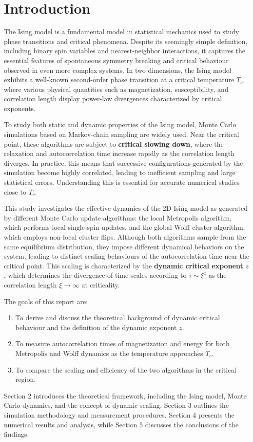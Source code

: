 \section{Introduction}


The Ising model is a fundamental model in statistical mechanics used to study phase transitions and critical phenomena.
Despite its seemingly simple definition, including binary spin variables and nearest-neighbor interactions, it captures the essential features of spontaneous symmetry breaking and critical behaviour observed in even more complex systems.
In two dimensions, the Ising model exhibits a well-known second-order phase transition at a critical temperature $T_c$, where various physical quantities such as magnetization, susceptibility, and correlation length display power-law divergences characterized by critical exponents.

To study both static and dynamic properties of the Ising model, Monte Carlo simulations based on Markov-chain sampling are widely used.
Near the critical point, these algorithms are subject to \textbf{critical slowing down}, where the relaxation and autocorrelation time increase rapidly as the correlation length diverges.
In practice, this means that successive configurations generated by the simulation become highly correlated, leading to inefficient sampling and large statistical errors.
Understanding this is essential for accurate numerical studies close to $T_c$.

This study investigates the effective dynamics of the 2D Ising model as generated by different Monte Carlo update algorithms: the local Metropolis algorithm, which performs local single-spin updates, and the global Wolff cluster algorithm, which employs non-local cluster flips.
Although both algorithms sample from the same equilibrium distribution, they impose different dynamical behaviors on the system, leading to distinct scaling behaviours of the autocorrelation time near the critical point.
This scaling is characterized by the \textbf{dynamic critical exponent} $z$, which determines the divergence of time scales according to $\tau \sim \xi^{z}$ as the correlation length $\xi \to \infty$ at criticality.

The goals of this report are:

\begin{enumerate}
    \item To derive and discuss the theoretical background of dynamic critical behaviour and the definition of the dynamic exponent \(z\).
    \item To measure autocorrelation times of magnetization and energy for both Metropolis and Wolff dynamics as the temperature approaches $T_c$.
    \item To compare the scaling and efficiency of the two algorithms in the critical region.
\end{enumerate}

Section 2 introduces the theoretical framework, including the Ising model, Monte Carlo dynamics, and the concept of dynamic scaling. Section 3 outlines the simulation methodology and measurement procedures. Section 4 presents the numerical results and analysis, while Section 5 discusses the conclusions of the findings.